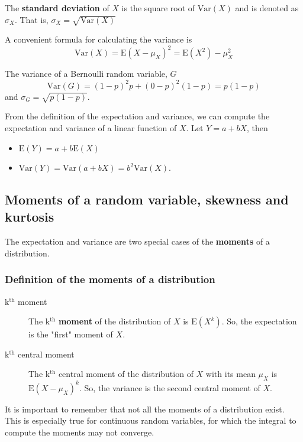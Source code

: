 \documentclass[a4paper,11pt]{article}
\begin{document}
The \textbf{standard deviation} of \(X\) is the square root of
\(\mathrm{Var}(X)\) and is denoted as \(\sigma_{X}\). That is,
\(\sigma_{X} = \sqrt{\mathrm{Var}(X)}\)

A convenient formula for calculating the variance is
\[ \mathrm{Var}(X) = \mathrm{E}(X - \mu_X)^{2} = \mathrm{E}(X^{2}) - \mu_X^{2} \]

The variance of a Bernoulli random variable, \(G\)
\[ \mathrm{Var}(G) = (1-p)^{2}p + (0-p)^{2}(1-p) = p(1-p) \] and \(\sigma_{G} =
\sqrt{p(1-p)}\).

From the definition of the expectation and variance, we can compute
the expectation and variance of a linear function of \(X\). Let \(Y = a +
bX\), then
\begin{itemize}
\item \(\mathrm{E}(Y) = a + b\mathrm{E}(X)\)
\item \(\mathrm{Var}(Y) = \mathrm{Var}(a + b X) = b^{2} \mathrm{Var}(X)\).
\end{itemize}


\subsection{Moments of a random variable, skewness and kurtosis}
\label{sec:orgc6c9849}

The expectation and variance are two special cases of the \textbf{moments} of
a distribution.

\subsubsection*{Definition of the moments of a distribution}
\label{sec:org53cb2ae}

\begin{description}
\item[{k\(^{\text{th}}\) moment}] The k\(^{\text{th}}\) \textbf{moment} of the distribution of \(X\) is
\(\mathrm{E}(X^{k})\). So, the expectation is the "first"
moment of \(X\).

\item[{k\(^{\text{th}}\) central moment}] The k\(^{\text{th}}\) central moment of the distribution
of \(X\) with its mean \(\mu_X\) is \(\mathrm{E}(X - \mu_X)^{k}\). So, the
variance is the second central moment of \(X\).
\end{description}

It is important to remember that not all the moments of a distribution
exist. This is especially true for continuous random variables, for
which the integral to compute the moments may not converge.
\end{document}
